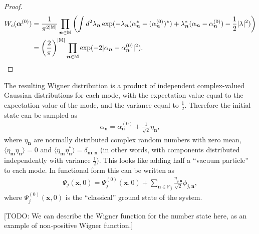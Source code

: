 \documentclass[12pt,aip,jmp,amssymb,amsmath]{revtex4-1}
\begin{document}
\begin{proof}
\begin{equation}
\begin{split}
    W_c (\boldsymbol{\alpha}^{(0)})
    & = \frac{1}{\pi^{2|\mathbb{M}|}} \prod_{\boldsymbol{n} \in \mathbb{M}} \left(
        \int d^2\lambda_{\boldsymbol{n}}
            \exp(
                - \lambda_{\boldsymbol{n}} (\alpha_{\boldsymbol{n}}^* - (\alpha_{\boldsymbol{n}}^{(0)})^*)
                + \lambda_{\boldsymbol{n}}^* (\alpha_{\boldsymbol{n}} - \alpha_{\boldsymbol{n}}^{(0)})
                - \frac{1}{2} |\lambda|^2
            )
    \right) \\
    & = \left( \frac{2}{\pi} \right)^{|\mathbb{M}|} \prod_{\boldsymbol{n} \in \mathbb{M}}
        \exp(-2 |\alpha_{\boldsymbol{n}} - \alpha_{\boldsymbol{n}}^{(0)}|^2).
    \qedhere
\end{split}\end{equation}
\end{proof}

The resulting Wigner distribution is a product of independent complex-valued Gaussian distributions for each mode,
with the expectation value equal to the expectation value of the mode,
and the variance equal to $\frac{1}{2}$.
Therefore the initial state can be sampled as
\begin{equation}\begin{split}
    \alpha_{\boldsymbol{n}} = \alpha_{\boldsymbol{n}}^{(0)} + \frac{1}{\sqrt{2}} \eta_{\boldsymbol{n}},
\end{split}\end{equation}
where $\eta_{\boldsymbol{n}}$ are normally distributed complex random numbers with zero mean,
$\langle \eta_{\boldsymbol{m}} \eta_{\boldsymbol{n}} \rangle = 0$ and
$\langle \eta_{\boldsymbol{m}} \eta_{\boldsymbol{n}}^* \rangle = \delta_{\boldsymbol{m},\boldsymbol{n}}$
(in other words, with components distributed independently with variance $\frac{1}{2}$).
This looks like adding half a ``vacuum particle'' to each mode.
In functional form this can be written as
\begin{equation}\begin{split}
    \Psi_j(\boldsymbol{x}, 0)
    = \Psi_j^{(0)}(\boldsymbol{x}, 0)
        + \sum_{\boldsymbol{n} \in \mathbb{M}_j} \frac{\eta_{j,\boldsymbol{n}}}{\sqrt{2}} \phi_{j,\boldsymbol{n}},
\end{split}\end{equation}
where $\Psi_j^{(0)}(\boldsymbol{x}, 0)$ is the ``classical'' ground state of the system.

[TODO: We can describe the Wigner function for the number state here, as an example of non-positive Wigner function.]
\end{document}
